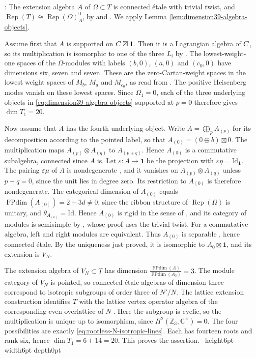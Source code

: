 \documentclass[leqno]{article}
\newcommand{\Cbb}{\ensuremath{\mathbb{C}}}
\let\cal\relax
\newcommand{\cal}{\mathcal}
\newcommand{\Z}{\ensuremath{\mathbb{Z}}}
\newcommand{\Id}{\mathrm{Id}}
\newcommand{\qed}{\hfill \vrule height6pt  width6pt depth0pt}
\newcommand{\co}{\colon}
\newcommand{\ot}{\otimes}
\newcommand{\epsi}{\varepsilon}
\DeclareMathOperator{\Rep}{Rep}
\newenvironment{proof}[1][]{\noindent {\it Proof #1} : }{\hbox{~}\qed
\smallskip
}
\numberwithin{equation}{section}
\begin{document}
\begin{proof}
The extension algebra $A$ of $\Omega \subset T$ is connected \'etale with trivial twist, and $\Rep(T) \cong \Rep(\Omega)_A^0$, by \cite{HKL15} and \cite[Lemma 2.3 p.~12]{Arh26b}. We apply Lemma \ref{lem:dimension39-algebra-objects}.

Assume first that $A$ is supported on $\cal C\boxtimes\mathbf 1$. Then it is a Lagrangian algebra of $\cal C$, so its multiplication is isomorphic to one of the three $L_i$ by \cite[Proposition 3.3 p.~16]{Arh26b}. The lowest-weight-one spaces of the $\Omega$-modules with labels $(b,0)$, $(a,0)$ and $(c_0,0)$ have dimensions six, seven and seven. These are the zero-Cartan-weight spaces in the lowest weight spaces of $M_b$, $M_a$ and $M_{c_0}$, as read from \cite[Table 2 p.~24]{Arh26a}. The positive Heisenberg modes vanish on these lowest spaces. Since $\Omega_1 = 0$, each of the three underlying objects in \eqref{eq:dimension39-algebra-objects} supported at $p = 0$ therefore gives $\dim T_1 = 20$.

Now assume that $A$ has the fourth underlying object. Write $A = \bigoplus_pA_{(p)}$ for its decomposition according to the pointed label, so that $A_{(0)} = (0\oplus b)\boxtimes0$. The multiplication maps $A_{(p)}\ot A_{(q)}$ to $A_{(p+q)}$. Hence $A_{(0)}$ is a commutative subalgebra, connected since $A$ is. Let $\epsi \co A \to \mathbf1$ be the projection with $\epsi\eta = \Id_{\mathbf1}$. The pairing $\epsi\mu$ of $A$ is nondegenerate \cite[Remark 3.4 p.~7]{DMNO13}, and it vanishes on $A_{(p)}\ot A_{(q)}$ unless $p+q = 0$, since the unit lies in degree zero. Its restriction to $A_{(0)}$ is therefore nondegenerate. The categorical dimension of $A_{(0)}$ equals $\operatorname{FPdim}(A_{(0)}) = 2+3d \neq 0$, since the ribbon structure of $\Rep(\Omega)$ is unitary, and $\theta_{A_{(0)}} = \Id$. Hence $A_{(0)}$ is rigid in the sense of \cite[Definition 1.11 p.~10]{KiO02}, and its category of modules is semisimple by \cite[Theorem 3.3 p.~17]{KiO02}, whose proof uses the trivial twist. For a commutative algebra, left and right modules are equivalent. Thus $A_{(0)}$ is separable \cite[Proposition 2.7 p.~5]{DMNO13}, hence connected \'etale. By the uniqueness just proved, it is isomorphic to $A_0\boxtimes\mathbf1$, and its extension is $V_N$.

The extension algebra of $V_N \subset T$ has dimension $\frac{\operatorname{FPdim}(A)}{\operatorname{FPdim}(A_0)} = 3$. The module category of $V_N$ is pointed, so connected \'etale algebras of dimension three correspond to isotropic subgroups of order three of $N'/N$. The lattice extension construction identifies $T$ with the lattice vertex operator algebra of the corresponding even overlattice of $N$ \cite{Don93,HKL15}. Here the subgroup is cyclic, so the multiplication is unique up to isomorphism, since $H^2(\Z_3,\Cbb^\times) = 0$. The four possibilities are exactly \eqref{eq:rootless-N-isotropic-lines}. Each has fourteen roots and rank six, hence $\dim T_1 = 6+14 = 20$. This proves the assertion.
\end{proof}
\end{document}
